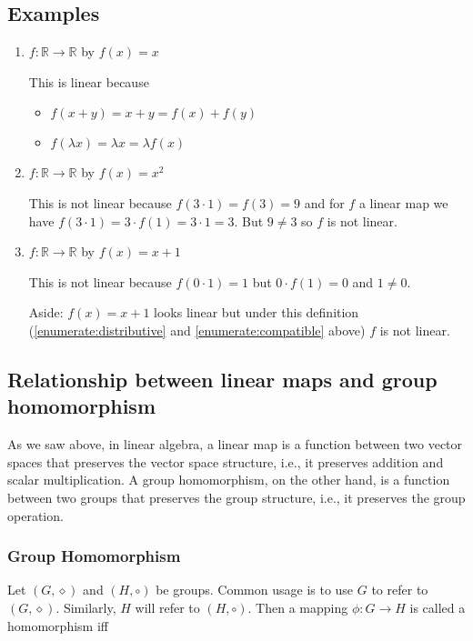 \documentclass{article}
\theoremstyle{definition}
\begin{document}
\subsection{Examples}

\begin{enumerate}
\item $f: \mathbb{R} \rightarrow \mathbb{R}$ by $f(x) = x$

\medskip
This is linear because 
\begin{itemize}
\item $f(x+y) = x + y = f(x) + f(y)$  
\item $f(\lambda x) = \lambda x = \lambda f(x)$	
\end{itemize}

\medskip
\item $f: \mathbb{R} \rightarrow \mathbb{R}$ by $f(x) = x^2$

\medskip
This is not linear because $f(3\cdot 1) = f(3) = 9$ and
for $f$ a linear map we have $f(3 \cdot 1) = 3 \cdot 
f(1) = 3 \cdot 1 = 3$. But $9 \neq 3$ so $f$ is not linear.

\medskip
\item $f: \mathbb{R} \rightarrow \mathbb{R}$ by $f(x) = x+1$

\medskip
This is not linear because $f(0 \cdot 1) = 1$ but 
$0\cdot f(1) = 0$ and $1 \neq 0$.

\smallskip
\noindent
Aside: $f(x) = x+1$ looks linear but under this definition
(\ref{enumerate:distributive} and \ref{enumerate:compatible}
above) $f$ is not linear.
\end{enumerate}

\subsection{Relationship between linear maps and group homomorphism}
As we saw above, in linear algebra, a linear map is a function
between two vector spaces that preserves the vector space
structure, i.e., it preserves addition and scalar
multiplication. A group homomorphism, on the other hand, is a
function between two groups that preserves the group structure,
i.e., it preserves the group operation.


\subsubsection{Group Homomorphism}
Let $(G,\diamond)$ and $(H, \circ)$ be groups. Common usage is to
use $G$ to refer to $(G,\diamond)$. Similarly, $H$ will refer to
$(H, \circ)$. Then a mapping $\phi: G \rightarrow H$ is called a
homomorphism iff
\end{document}
